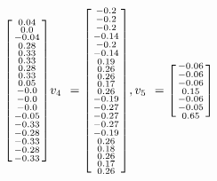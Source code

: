 \documentclass[a4paper,hidelinks,14pt]{extarticle}
\begin{document}
$$\begin{bsmallmatrix}
		0.04\\ 
		0.0\\  
		-0.04\\
		0.28\\ 
		0.33\\  
		0.33\\  
		0.28\\  
		0.33\\  
		0.05\\  
		-0.0\\  
		-0.0\\  
		-0.0\\  
		-0.05\\ 
		-0.33\\ 
		-0.28\\
		-0.33\\ 
		-0.28\\ 
		-0.33\\ 
	\end{bsmallmatrix}
	v_{4\phantom{1}}=\begin{bsmallmatrix}
	-0.2\\   
	-0.2\\   
	-0.2\\   
	-0.14\\ 
	-0.2\\   
	-0.14\\
	0.19\\  
	0.26\\   
	0.26\\   
	0.17\\   
	0.26\\   
	-0.19\\  
	-0.27\\  
	-0.27\\  
	-0.27\\  
	-0.19\\ 
	0.26\\  
	0.18\\ 
	0.26\\  
	0.17\\  
	0.26\\  
	\end{bsmallmatrix},
		v_{5\phantom{1}}=\begin{bsmallmatrix}
		-0.06\\ 
		-0.06\\ 
		-0.06\\ 
		0.15\\ 
		-0.06\\ 
		-0.05\\ 
		0.65\\  

\end{bsmallmatrix}$$
\end{document}
